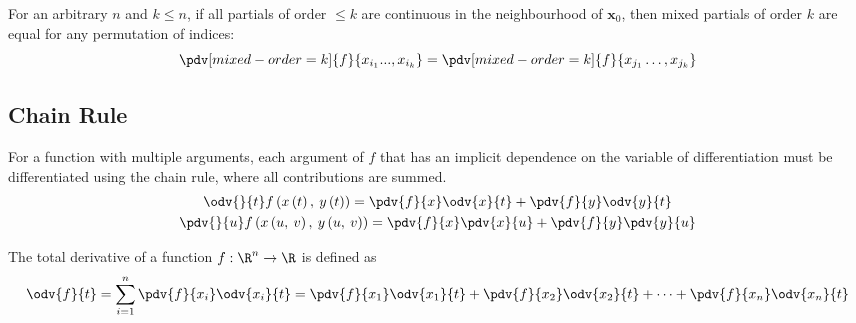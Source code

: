 \documentclass{article}
\begin{document}
\begin{remark}
    For an arbitrary \(n\) and \(k \leqslant n\), if all partials of order \(\leqslant \! k\) are continuous in the neighbourhood of \(\symbf{x}_0\),
    then mixed partials of order \(k\) are equal for any permutation of indices:
    \begin{equation*}
        \pdv[mixed-order=k]{f}{x_{i_1}...,x_{i_k}} = \pdv[mixed-order=k]{f}{x_{j_1}\ldots,x_{j_k}}
    \end{equation*}
\end{remark}
\subsection{Chain Rule}
For a function with multiple arguments, each argument of \(f\) that has
an implicit dependence on the variable of differentiation must be
differentiated using the chain rule, where all contributions are
summed.
\begin{gather*}
    \odv{}{t} f\left( x\left( t \right),\: y\left( t \right) \right) = \pdv{f}{x} \odv{x}{t} + \pdv{f}{y} \odv{y}{t} \\
    \pdv{}{u} f\left( x\left( u,\: v \right),\: y\left( u,\: v \right) \right) = \pdv{f}{x} \pdv{x}{u} + \pdv{f}{y} \pdv{y}{u}
\end{gather*}
\begin{definition}
    The total derivative of a function \(f : \R^n \to \R\) is defined as
    \begin{equation*}
        \odv{f}{t} = \sum_{i = 1}^n \pdv{f}{x_i} \odv{x_i}{t} = \pdv{f}{x_1} \odv{x_1}{t} + \pdv{f}{x_2} \odv{x_2}{t} + \cdots + \pdv{f}{x_n} \odv{x_n}{t}
    \end{equation*}
\end{definition}
\end{document}
